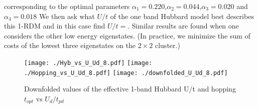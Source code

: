 \documentclass[prl,12pt,onecolumn,nofootinbib,notitlepage,english,superscriptaddress]{revtex4-1}
\begin{document}
corresponding to the optimal parameters $\alpha_1=0.220$,$\alpha_2=0.044$,$\alpha_3=0.020$ and $\alpha_4=0.018$ 
We then ask what $U/t$ of the one band Hubbard model best describes this 1-RDM and in this case find $U/t = $. 
Similar results are found when one considers the other low energy eigenstates. 
(In practice, we minimize the sum of costs of the lowest three eigenstates on the $2 \times 2$ cluster.) 

\begin{figure}[]
\centering
\texttt{[image: ./Hyb\_vs\_U\_Ud\_8.pdf]}
\texttt{[image: ./Hopping\_vs\_U\_Ud\_8.pdf]}
\texttt{[image: ./downfolded\_U\_Ud\_8.pdf]}
\caption{Downfolded values of the effective 1-band Hubbard U/t and hopping $t_{opt}$ vs $U_d/t_{pd}$}
\label{fig:hamfit} 
\end{figure}	
\end{document}
